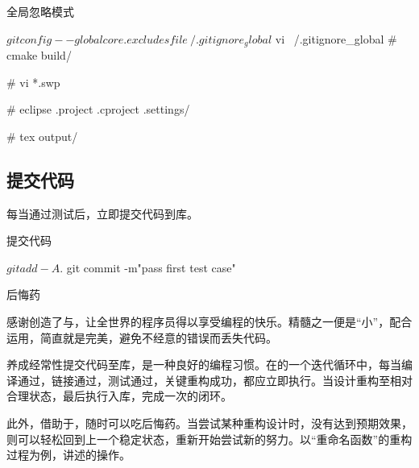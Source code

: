 \begin{content}
\begin{episode}{全局忽略模式}
\begin{content}
 \begin{c++}
$ git config --global core.excludesfile ~/.gitignore_global
$ vi ~/.gitignore_global
# cmake
build/

# vi
*.swp

# eclipse
.project
.cproject
.settings/

# tex
output/
 \end{c++}

\end{content}
\end{episode}

\subsection{提交代码}

每当通过测试后，立即提交代码到库。

\begin{nodiff}{提交代码}
 \begin{c++}
$ git add -A .
$ git commit -m"pass first test case"
 \end{c++}
\end{nodiff}

\begin{episode}{后悔药}

\begin{content}

感谢创造了与，让全世界的程序员得以享受编程的快乐。精髓之一便是“小”，配合运用，简直就是完美，避免不经意的错误而丢失代码。

养成经常性提交代码至库，是一种良好的编程习惯。在的一个迭代循环中，每当编译通过，链接通过，测试通过，关键重构成功，都应立即执行。当设计重构至相对合理状态，最后执行入库，完成一次的闭环。

此外，借助于，随时可以吃后悔药。当尝试某种重构设计时，没有达到预期效果，则可以轻松回到上一个稳定状态，重新开始尝试新的努力。以“重命名函数”的重构过程为例，讲述的操作。

\begin{enum}
\end{enum}

\end{content}
\end{episode}

\end{content}

